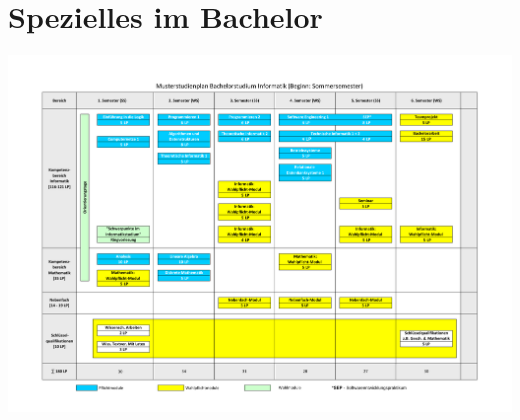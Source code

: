 \documentclass[]{papertex}
\begin{document}
	\section{Spezielles im Bachelor}
		\label{bachelor}
		
		
		\begin{multicols}{2}
		
		
		\end{multicols}
		\begin{center}
		\end{center}
		\begin{minipage}{1.0\linewidth}
			\begin{center}     
			\label{musterstudienplan}
			\includegraphics[angle=90, totalheight=\textheight, width=\textwidth ]{bilder/studienplan_bsc_ss/bscinformatikssneu42011.pdf}
			\end{center}  
		\end{minipage}
		\newpage
\end{document}
